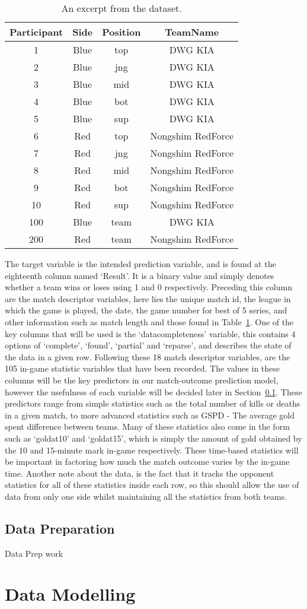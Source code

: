 \begin{table}[h!]
\centering
\caption{An excerpt from the dataset.}
\begin{tabular}{ c c c c }
 \hline
 Participant & Side & Position & TeamName \\ [0.5ex]
 \hline
 1 & Blue & top & DWG KIA \\
 2 & Blue & jng & DWG KIA \\
 3 & Blue & mid & DWG KIA \\
 4 & Blue & bot & DWG KIA \\
 5 & Blue & sup & DWG KIA \\
 6 & Red & top & Nongshim RedForce \\
 7 & Red & jng & Nongshim RedForce \\
 8 & Red & mid & Nongshim RedForce \\
 9 & Red & bot & Nongshim RedForce \\
 10 & Red & sup & Nongshim RedForce \\
 100 & Blue & team & DWG KIA \\
 200 & Red & team & Nongshim RedForce \\ [1ex]
 \hline
\end{tabular}
\label{tab:1}
\end{table}

The target variable is the intended prediction variable, and is found at the eighteenth column named `Result'.
It is a binary value and simply denotes whether a team wins or loses using 1 and 0 respectively.
Preceding this column are the match descriptor variables, here lies the unique match id, the league in which the game is played, the date, the game number for best of 5 series, and other information such as match length and those found in Table~\ref{tab:1}.
One of the key columns that will be used is the `datacompleteness' variable, this contains 4 options of `complete', `found', `partial' and `reparse', and describes the state of the data in a given row.
Following these 18 match descriptor variables, are the 105 in-game statistic variables that have been recorded.
The values in these columns will be the key predictors in our match-outcome prediction model, however the usefulness of each variable will be decided later in Section~\ref{subsec:Data Preparation}.
These predictors range from simple statistics such as the total number of kills or deaths in a given match, to more advanced statistics such as GSPD - The average gold spent difference between teams.
Many of these statistics also come in the form such as `goldat10' and `goldat15', which is simply the amount of gold obtained by the 10 and 15-minute mark in-game respectively.
These time-based statistics will be important in factoring how much the match outcome varies by the in-game time.
Another note about the data, is the fact that it tracks the opponent statistics for all of these statistics inside each row, so this should allow the use of data from only one side whilst maintaining all the statistics from both teams.

\subsection{Data Preparation}\label{subsec:Data Preparation}
Data Prep work

\section{Data Modelling}\label{sec:Data Modelling}
